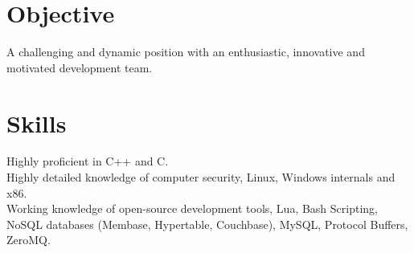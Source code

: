 \documentclass[margin]{res}
\begin{document}
 
 

\address{david.andrews112@gmail.com \ \ \ (949) 633-0588}


 
\begin{resume}  

\section{Objective}
A challenging and dynamic position with an enthusiastic, innovative and motivated development team.


\section{Skills}
\noindent
Highly proficient in C++ and C. \\
Highly detailed knowledge of computer security, Linux, Windows internals and x86. \\
Working knowledge of open-source development tools, Lua, Bash
Scripting, NoSQL databases (Membase, Hypertable, Couchbase), MySQL,
Protocol Buffers, ZeroMQ.






\end{resume}
\end{document}
